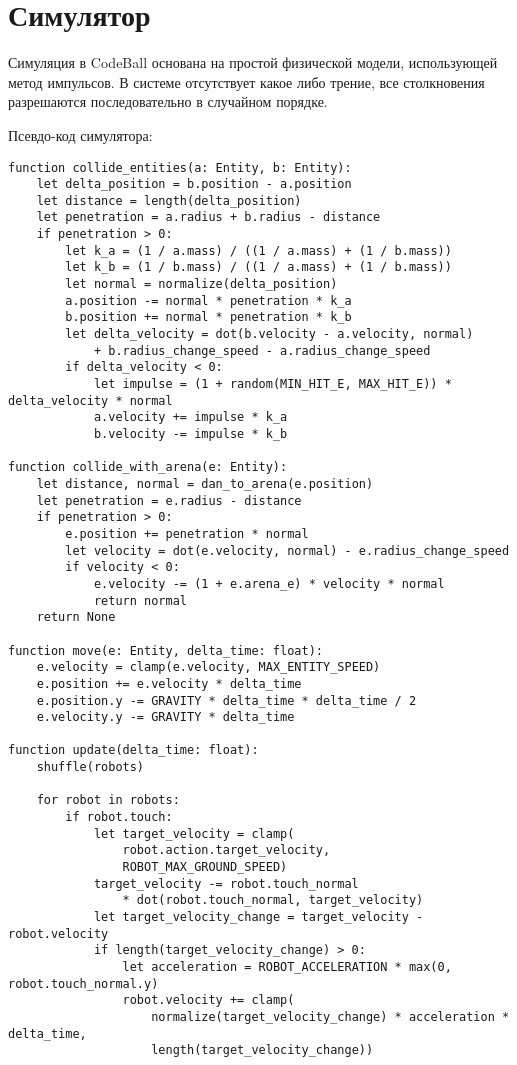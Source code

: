 \chapter{Симулятор}

Симуляция в CodeBall основана на простой физической модели, использующей метод импульсов.
В системе отсутствует какое либо трение, все столкновения разрешаются последовательно в случайном порядке.

Псевдо-код симулятора:

\begin{verbatim}
function collide_entities(a: Entity, b: Entity):
    let delta_position = b.position - a.position
    let distance = length(delta_position)
    let penetration = a.radius + b.radius - distance
    if penetration > 0:
        let k_a = (1 / a.mass) / ((1 / a.mass) + (1 / b.mass))
        let k_b = (1 / b.mass) / ((1 / a.mass) + (1 / b.mass))
        let normal = normalize(delta_position)
        a.position -= normal * penetration * k_a
        b.position += normal * penetration * k_b
        let delta_velocity = dot(b.velocity - a.velocity, normal)
            + b.radius_change_speed - a.radius_change_speed
        if delta_velocity < 0:
            let impulse = (1 + random(MIN_HIT_E, MAX_HIT_E)) * delta_velocity * normal
            a.velocity += impulse * k_a
            b.velocity -= impulse * k_b

function collide_with_arena(e: Entity):
    let distance, normal = dan_to_arena(e.position)
    let penetration = e.radius - distance
    if penetration > 0:
        e.position += penetration * normal
        let velocity = dot(e.velocity, normal) - e.radius_change_speed
        if velocity < 0:
            e.velocity -= (1 + e.arena_e) * velocity * normal
            return normal
    return None

function move(e: Entity, delta_time: float):
    e.velocity = clamp(e.velocity, MAX_ENTITY_SPEED)
    e.position += e.velocity * delta_time
    e.position.y -= GRAVITY * delta_time * delta_time / 2
    e.velocity.y -= GRAVITY * delta_time

function update(delta_time: float):
    shuffle(robots)

    for robot in robots:
        if robot.touch:
            let target_velocity = clamp(
                robot.action.target_velocity,
                ROBOT_MAX_GROUND_SPEED)
            target_velocity -= robot.touch_normal
                * dot(robot.touch_normal, target_velocity)
            let target_velocity_change = target_velocity - robot.velocity
            if length(target_velocity_change) > 0:
                let acceleration = ROBOT_ACCELERATION * max(0, robot.touch_normal.y)
                robot.velocity += clamp(
                    normalize(target_velocity_change) * acceleration * delta_time,
                    length(target_velocity_change))


\end{verbatim}
